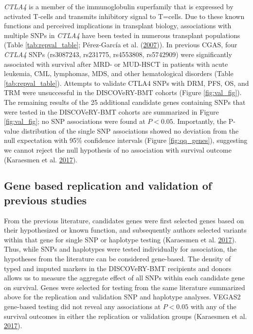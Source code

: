 \documentclass[]{DissertateOSU}
\begin{document}
\emph{CTLA4} is a member of the immunoglobulin superfamily that is
expressed by activated T-cells and transmits inhibitory signal to
T=cells. Due to these known functions and perceived implications in
transplant biology, associations with multiple SNPs in \emph{CTLA4} have
been tested in numerous transplant populations (Table
\ref{tab:repval_table}; Pérez-García et al.
(\protect\hyperlink{ref-perez_garcia_2007}{2007})). In previous CGAS,
four \emph{CTLA4} SNPs (rs3087243, rs231775, rs4553808, rs5742909) were
significantly associated with survival after MRD- or MUD-HSCT in
patients with acute leukemia, CML, lymphomas, MDS, and other
hematological disorders (Table \ref{tab:repval_table}). Attempts to
validate CTLA4 SNPs with DRM, PFS, OS, and TRM were unsuccessful in the
DISCOVeRY-BMT cohorts (Figure \ref{fig:val_fig}). The remaining results
of the 25 additional candidate genes containing SNPs that were tested in
the DISCOVeRY-BMT cohorts are summarized in Figure \ref{fig:val_fig}; no
SNP associations were found at \(P<0.05\). Importantly, the P-value
distribution of the single SNP associations showed no deviation from the
null expectation with 95\% confidence intervals (Figure
\ref{fig:qq_genes}), suggesting we cannot reject the null hypothesis of
no association with survival outcome (Karaesmen et al.
\protect\hyperlink{ref-Karaesmen_2017}{2017}).

\subsection{Gene based replication and validation of previous
studies}\label{gene-based-replication-and-validation-of-previous-studies}

From the previous literature, candidates genes were first selected genes
based on their hypothesized or known function, and subsequently authors
selected variants within that gene for single SNP or haplotype testing
(Karaesmen et al. \protect\hyperlink{ref-Karaesmen_2017}{2017}). Thus,
while SNPs and haplotypes were tested individually for association, the
hypotheses from the literature can be considered gene-based. The density
of typed and imputed markers in the DISCOVeRY-BMT recipients and donors
allows us to measure the aggregate effect of all SNPs within each
candidate gene on survival. Genes were selected for testing from the
same literature summarized above for the replication and validation SNP
and haplotype analyses. VEGAS2 gene-based testing did not reveal any
associations at \(P < 0.05\) with any of the survival outcomes in either
the replication or validation groups (Karaesmen et al.
\protect\hyperlink{ref-Karaesmen_2017}{2017}).
\end{document}
